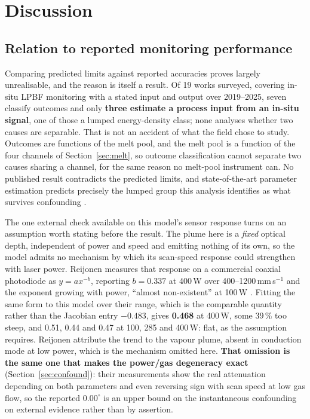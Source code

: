 \documentclass[final,5p,times,twocolumn]{elsarticle}
\begin{document}
\section{Discussion}

\subsection{Relation to reported monitoring performance}

Comparing predicted limits against reported accuracies proves largely
unrealisable, and the reason is itself a result. Of 19 works surveyed, covering in-situ
LPBF monitoring with a stated input and output over 2019--2025, seven classify
outcomes and only \textbf{three estimate a process input from an in-situ
signal}, one of those a lumped energy-density class; none analyses whether two
causes are separable. That is not an accident of what the field chose to study.
Outcomes are functions of the melt pool, and the melt pool is a function of the
four channels of Section~\ref{sec:melt}, so outcome classification cannot
separate two causes sharing a channel, for the same reason no melt-pool
instrument can. No published result contradicts the predicted limits, and
state-of-the-art parameter estimation predicts precisely the lumped group this
analysis identifies as what survives confounding \cite{kNN2025}.

The one external check available on this model's sensor response turns on an
assumption worth stating before the result. The plume here is a \emph{fixed}
optical depth, independent of power and speed and emitting nothing of its own,
so the model admits no mechanism by which its scan-speed response could
strengthen with laser power. Reijonen measures that response on a commercial
coaxial photodiode as $y=ax^{-b}$, reporting $b=0.337$ at 400\,W over
400--1200\,mm\,s$^{-1}$ and the exponent growing with power, ``almost
non-existent'' at 100\,W \cite{Reijonen2024}. Fitting the same form to this
model over their range, which is the comparable quantity rather than the Jacobian
entry $-0.483$, gives \textbf{0.468} at 400\,W, some 39\,\% too steep, and
0.51, 0.44 and 0.47 at 100, 285 and 400\,W: flat, as the assumption requires.
Reijonen attribute the trend to the vapour plume, absent in conduction mode at
low power, which is the mechanism omitted here. \textbf{That omission is the
same one that makes the power/gas degeneracy exact} (Section~\ref{sec:confound}):
their measurements show the real attenuation depending on both parameters and
even reversing sign with scan speed at low gas flow, so the reported
$0.00^\circ$ is an upper bound on the instantaneous confounding on external
evidence rather than by assertion.
\end{document}
